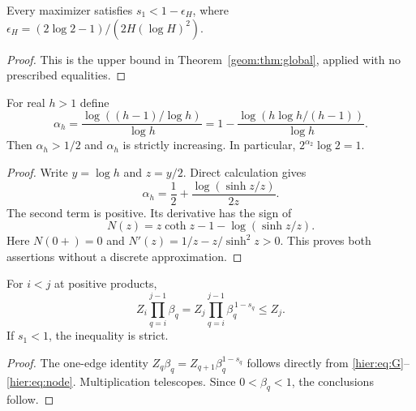 \begin{lemma}\label{hier:lem:upper}
Every maximizer satisfies $s_1<1-\epsilon_H$, where
$\epsilon_H=(2\log2-1)/(2H(\log H)^2)$.
\end{lemma}
\begin{proof}
This is the upper bound in Theorem~\ref{geom:thm:global}, applied with
no prescribed equalities.
\end{proof}

\begin{lemma}\label{hier:lem:alpha}
For real $h>1$ define
\[
 \alpha_h=\frac{\log((h-1)/\log h)}{\log h}
 =1-\frac{\log(h\log h/(h-1))}{\log h}.
\]
Then $\alpha_h>1/2$ and $\alpha_h$ is strictly increasing.
In particular, $2^{\alpha_2}\log2=1$.
\end{lemma}
\begin{proof}
Write $y=\log h$ and $z=y/2$. Direct calculation gives
\[
 \alpha_h=\frac12+\frac{\log(\sinh z/z)}{2z}.
\]
The second term is positive. Its derivative has the sign of
\[
 N(z)=z\coth z-1-\log(\sinh z/z).
\]
Here $N(0+)=0$ and $N'(z)=1/z-z/\sinh^2z>0$. This proves both
assertions without a discrete approximation.
\end{proof}

\begin{lemma}\label{hier:lem:transport}
For $i<j$ at positive products,
\begin{equation}
 Z_i\prod_{q=i}^{j-1}\beta_q
 =Z_j\prod_{q=i}^{j-1}\beta_q^{\,1-s_q}\le Z_j.
 \label{hier:eq:transport}
\end{equation}
If $s_1<1$, the inequality is strict.
\end{lemma}
\begin{proof}
The one-edge identity $Z_q\beta_q=Z_{q+1}\beta_q^{1-s_q}$ follows
directly from \eqref{hier:eq:G}--\eqref{hier:eq:node}. Multiplication telescopes.
Since $0<\beta_q<1$, the conclusions follow.
\end{proof}


